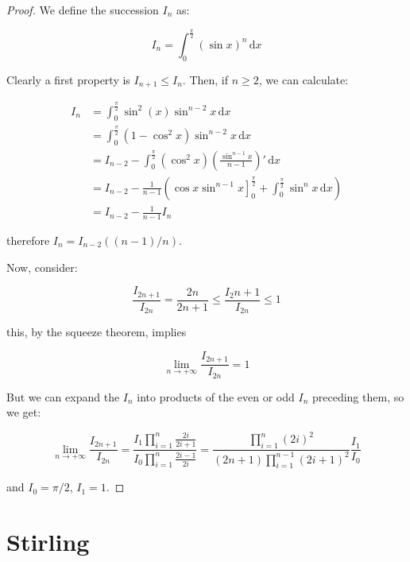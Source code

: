 \documentclass[12pt,a4paper]{report}
\numberwithin{equation}{section}
\theoremstyle{definition}
\theoremstyle{remark}
\begin{document}
\begin{proof}
We define the succession $I_n$ as:

\begin{equation}
I_n = \int^{\frac{\pi}{2}}_{0} (\sin x )^n \, \text{d}x
\end{equation}

Clearly a first property is $I_{n+1} \leq I_n$. Then, if $n\geq 2$, we can calculate:

\begin{align*}
I_n &= \int^{\frac{\pi}{2}}_{0} \sin^2 (x) \sin^{n-2} x \, \text{d}x\\
&= \int^{\frac{\pi}{2}}_{0} (1-\cos^2 x) \sin^{n-2} x \, \text{d}x\\
&= I_{n-2} -\int^{\frac{\pi}{2}}_{0} (\cos^2 x) \left( \frac{\sin^{n-1} x}{n-1} \right)' \, \text{d}x\\
&= I_{n-2} -\frac{1}{n-1} \left(\left. \cos x \sin^{n-1} x \right]^{\frac{\pi}{2}}_0 + \int^{\frac{\pi}{2}}_{0} \sin^n x \, \text{d}x \right)\\
&= I_{n-2} - \frac{1}{n-1} I_n
\end{align*}

therefore $I_n = I_{n-2} ((n-1)/n)$.

Now, consider:

\begin{equation}
\frac{I_{2n+1}}{I_{2n}} = \frac{2n}{2n+1}\leq \frac{I_2n+1}{I_{2n}} \leq 1
\end{equation}

this, by the squeeze theorem, implies

\begin{equation}
\lim_{n\rightarrow +\infty} \frac{I_{2n+1}}{I_{2n}} =1
\end{equation}

But we can expand the $I_n$ into products of the even or odd $I_n$ preceding them, so we get:

\begin{equation}
\lim_{n\rightarrow+\infty} \frac{I_{2n+1}}{I_{2n}} = \frac{I_1 \displaystyle\prod_{i=1}^{n} \frac{2i}{2i+1}}{I_0 \displaystyle \prod _{i=1}^{n} \frac{2i-1}{2i}} = \frac{\displaystyle\prod_{i=1}^{n} (2i)^2}{(2n+1)\displaystyle \prod _{i=1}^{n-1} (2i+1)^2} \frac{I_1}{I_0}
\end{equation}

and $I_0 = \pi /2$, $I_1 = 1$.
\end{proof}

\section{Stirling}
\end{document}
